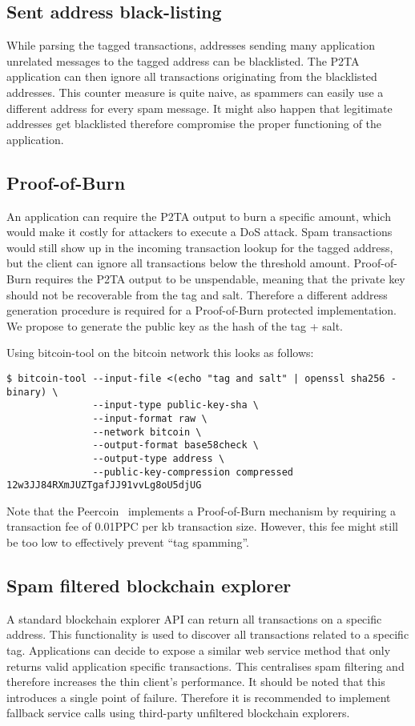 \documentclass[a4paper,10pt]{article}
\begin{document}
\subsection{Sent address black-listing}
While parsing the tagged transactions, addresses sending many application unrelated messages to the tagged address can be blacklisted.
The P2TA application can then ignore all transactions originating from the blacklisted addresses.
This counter measure is quite naive, as spammers can easily use a different address for every spam message.
It might also happen that legitimate addresses get blacklisted therefore compromise the proper functioning of the application.

\subsection{Proof-of-Burn}
An application can require the P2TA output to burn a specific amount,
which would make it costly for attackers to execute a DoS attack.
Spam transactions would still show up in the incoming transaction lookup for the tagged address,
but the client can ignore all transactions below the threshold amount.
Proof-of-Burn requires the P2TA output to be unspendable, meaning that the private key should not be recoverable from the tag and salt.
Therefore a different address generation procedure is required for a Proof-of-Burn protected implementation.
We propose to generate the public key as the hash of the tag + salt.

Using bitcoin-tool on the bitcoin network this looks as follows:
\begin{small}\begin{verbatim}
$ bitcoin-tool --input-file <(echo "tag and salt" | openssl sha256 -binary) \
               --input-type public-key-sha \
               --input-format raw \
               --network bitcoin \
               --output-format base58check \
               --output-type address \
               --public-key-compression compressed
12w3JJ84RXmJUZTgafJJ91vvLg8oU5djUG
\end{verbatim}\end{small}

Note that the Peercoin~\cite{King12} implements a Proof-of-Burn mechanism by requiring a transaction fee of 0.01PPC per kb transaction size.
However, this fee might still be too low to effectively prevent ``tag spamming''.

\subsection{Spam filtered blockchain explorer}
A standard blockchain explorer API can return all transactions on a specific address.
This functionality is used to discover all transactions related to a specific tag.
Applications can decide to expose a similar web service method that only returns valid application specific transactions.
This centralises spam filtering and therefore increases the thin client's performance.
It should be noted that this introduces a single point of failure.
Therefore it is recommended to implement fallback service calls using third-party unfiltered blockchain explorers.
\end{document}
